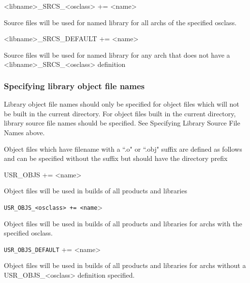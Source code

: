 \begin{description}\item \textless{}libname\textgreater{}\_SRCS\_\textless{}osclass\textgreater{} += \textless{}name\textgreater{}

\end{description}Source files will be used for named library for all archs of the specified osclass.

\begin{description}\item \textless{}libname\textgreater{}\_SRCS\_DEFAULT += \textless{}name\textgreater{}

\end{description}Source files will be used for named library for any arch that does not have a \textless{}libname\textgreater{}\_SRCS\_\textless{}osclass\textgreater{} 
definition

\subsubsection{Specifying library object file names}

Library object file names should only be specified for object files which will not be built in the current directory. For 
object files built in the current directory, library source file names should be specified. See Specifying Library Source File 
Names above.

Object files which have filename with a ``.o" or ``.obj" suffix are defined as follows and can be specified without the suffix 
but should have the directory prefix 

\begin{description}\item {}USR\_OBJS += \textless{}name\textgreater{}

\end{description}Object files will be used in builds of all products and libraries

\begin{description}\item \verb|USR_OBJS_<osclass> += <name|\textgreater{}

\end{description}Object files will be used in builds of all products and libraries for archs with the specified osclass.

\begin{description}\item \verb|USR_OBJS_DEFAULT| += \textless{}name\textgreater{}

\end{description}Object files will be used in builds of all products and libraries for archs without a USR\_OBJS\_\textless{}osclass\textgreater{} 
definition specified.

